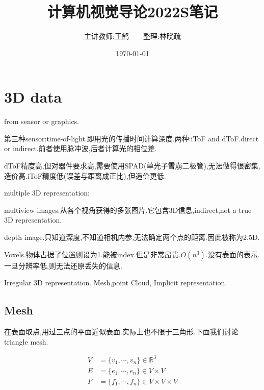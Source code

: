 

\title{计算机视觉导论2022S笔记}
\author{主讲教师:王鹤\ \ \ \ 整理:林晓疏}
\date{\today}

%


	\maketitle
	
	\clearpage
	\tableofcontents
	
	
	
	
	
	
	
	
	
	
	
	
	
	
	\clearpage
	\section{3D data}
	from sensor or graphics.
	
	第三种sensor:time-of-light.即用光的传播时间计算深度.两种:iToF and dToF.direct or indirect.前者使用脉冲波,后者计算光的相位差.
	
	dToF精度高,但对器件要求高,需要使用SPAD(单光子雪崩二极管),无法做得很密集,造价高.iToF精度低(误差与距离成正比),但造价更低.
	
	multiple 3D representation:
	
	multiview images.从各个视角获得的多张图片.它包含3D信息,indirect,not a true 3D representation.
	
	depth image.只知道深度,不知道相机内参,无法确定两个点的距离.因此被称为2.5D.
	
	Voxels.物体占据了位置则设为1.能被index.但是非常昂贵.$O(n^3)$.没有表面的表示.一旦分辨率低,则无法还原丢失的信息.
	
	Irregular 3D representation. Mesh,point Cloud, Implicit representation.
	
	\subsection{Mesh}
	在表面取点,用过三点的平面近似表面.实际上也不限于三角形.下面我们讨论triangle mesh.
	
	\begin{equation}
		\begin{aligned}
			V &= \{v_1, \cdots, v_n\} \in \mathbb R^3
			\\
			E &= \{e_1, \cdots, e_n\} \in V\times V
            \\
            F &= \{f_1, \cdots, f_n\} \in V\times V \times V
		\end{aligned}
	\end{equation}
	
